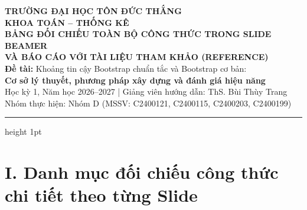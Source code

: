 \documentclass[10pt,a4paper]{article}
\begin{document}
\begin{center}
    {\large\bfseries TRƯỜNG ĐẠI HỌC TÔN ĐỨC THẮNG}\\[0.1cm]
    {\bfseries KHOA TOÁN -- THỐNG KÊ}\\[0.25cm]
    {\Large\bfseries\color{primary} BẢNG ĐỐI CHIẾU TOÀN BỘ CÔNG THỨC TRONG SLIDE BEAMER\\VÀ BÁO CÁO VỚI TÀI LIỆU THAM KHẢO (REFERENCE)}\\[0.2cm]
    {\normalsize\textbf{Đề tài:} Khoảng tin cậy Bootstrap chuẩn tắc và Bootstrap cơ bản:}\\[0.05cm]
    {\normalsize\textbf{Cơ sở lý thuyết, phương pháp xây dựng và đánh giá hiệu năng}}\\[0.15cm]
    {\small Học kỳ 1, Năm học 2026--2027 \quad | \quad Giảng viên hướng dẫn: ThS. Bùi Thùy Trang}\\[0.05cm]
    {\small Nhóm thực hiện: Nhóm D (MSSV: C2400121, C2400115, C2400203, C2400199)}
\end{center}

\vspace{0.15cm}
\hrule height 1pt
\vspace{0.3cm}

\section*{I. Danh mục đối chiếu công thức chi tiết theo từng Slide}
\end{document}
